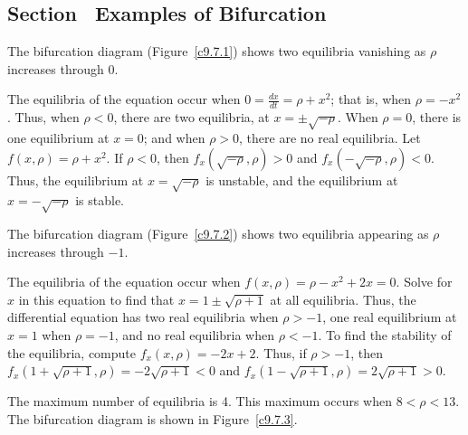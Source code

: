 \documentclass{ximera}
\begin{document}
\subsection*{Section~\protect{\ref{S:bifurcation}} Examples of Bifurcation}

\ans The bifurcation diagram (Figure~\ref{c9.7.1}) shows two equilibria
vanishing as $\rho$ increases through $0$.

\soln The equilibria of the equation occur when $0 = \frac{dx}{dt} =
\rho + x^2$; that is, when $\rho = -x^2$.  Thus, when $\rho < 0$, there
are two equilibria, at $x = \pm\sqrt{-\rho}$.  When $\rho = 0$, there is
one equilibrium at $x = 0$; and when $\rho > 0$, there are no real
equilibria.  Let $f(x,\rho) = \rho + x^2$.  If $\rho < 0$, 
then $f_x(\sqrt{-\rho},\rho) > 0$ and $f_x(-\sqrt{-\rho},\rho) < 0$. 
Thus, the equilibrium at $x = \sqrt{-\rho}$ is unstable, and the
equilibrium at $x = -\sqrt{-\rho}$ is stable.

\begin{figure}[htb]
                       \centerline{%
                       }
\end{figure}

\ans The bifurcation diagram (Figure~\ref{c9.7.2}) shows two equilibria
appearing as $\rho$ increases through $-1$.

\soln The equilibria of the equation occur when $f(x,\rho) = \rho - x^2 +
2x = 0$.  Solve for $x$ in this equation to find that $x = 1 \pm
\sqrt{\rho + 1}$ at all equilibria.  Thus, the differential equation has
two real equilibria when $\rho > -1$, one real equilibrium at $x = 1$ when
$\rho = -1$, and no real equilibria when $\rho < -1$.  To find the
stability of the equilibria, compute $f_x(x,\rho) = -2x + 2$.  Thus, if
$\rho > -1$, then
$f_x(1 + \sqrt{\rho + 1},\rho) = -2\sqrt{\rho + 1} < 0$ and
$f_x(1 - \sqrt{\rho + 1},\rho) = 2\sqrt{\rho + 1} > 0$.

\begin{figure}[htb]
                       \centerline{%
                       }
\end{figure}

\ans The maximum number of equilibria is 4.  This maximum occurs when
$8 < \rho < 13$.  The bifurcation diagram is shown in Figure~\ref{c9.7.3}.
\end{document}
